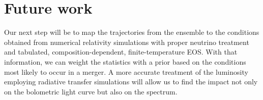 \section{Future work}

Our next step will be to map the trajectories from the ensemble to the conditions obtained from numerical relativity simulations with proper neutrino treatment and tabulated, composition-dependent, finite-temperature EOS.
With that information, we can weight the statistics with a prior based on the conditions most likely to occur in a merger.
A more accurate treatment of the luminosity employing radiative transfer simulations will allow us to find the impact not only on the bolometric light curve but also on the spectrum. 


